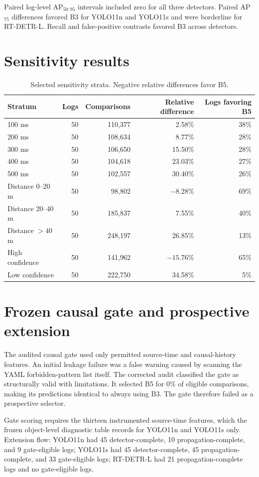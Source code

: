 \documentclass[11pt]{article}
\begin{document}
Paired log-level AP$_{50:95}$ intervals included zero for all three detectors. Paired AP$_{75}$ differences favored B3 for YOLO11n and YOLO11s and were borderline for RT-DETR-L. Recall and false-positive contrasts favored B3 across detectors.

\section{Sensitivity results}
\begin{table}[htbp]
\centering
\caption{Selected sensitivity strata. Negative relative differences favor B5.}
\small
\begin{tabular}{lrrrr}
\toprule
Stratum & Logs & Comparisons & Relative difference & Logs favoring B5\\
\midrule
100 ms & 50 & 110,377 & 2.58\% & 38\%\\
200 ms & 50 & 108,634 & 8.77\% & 28\%\\
300 ms & 50 & 106,650 & 15.50\% & 28\%\\
400 ms & 50 & 104,618 & 23.03\% & 27\%\\
500 ms & 50 & 102,557 & 30.40\% & 26\%\\
Distance 0--20 m & 50 & 98,802 & $-8.28$\% & 69\%\\
Distance 20--40 m & 50 & 185,837 & 7.55\% & 40\%\\
Distance $>40$ m & 50 & 248,197 & 26.85\% & 13\%\\
High confidence & 50 & 141,962 & $-15.76$\% & 65\%\\
Low confidence & 50 & 222,750 & 34.58\% & 5\%\\
\bottomrule
\end{tabular}
\end{table}

\section{Frozen causal gate and prospective extension}
The audited causal gate used only permitted source-time and causal-history features. An initial leakage failure was a false warning caused by scanning the YAML forbidden-pattern list itself. The corrected audit classified the gate as structurally valid with limitations. It selected B5 for 0\% of eligible comparisons, making its predictions identical to always using B3. The gate therefore failed as a prospective selector.

Gate scoring requires the thirteen instrumented source-time features, which the frozen object-level diagnostic table records for YOLO11n and YOLO11s only. Extension flow: YOLO11n had 45 detector-complete, 10 propagation-complete, and 9 gate-eligible logs; YOLO11s had 45 detector-complete, 45 propagation-complete, and 33 gate-eligible logs; RT-DETR-L had 21 propagation-complete logs and no gate-eligible logs.
\end{document}
